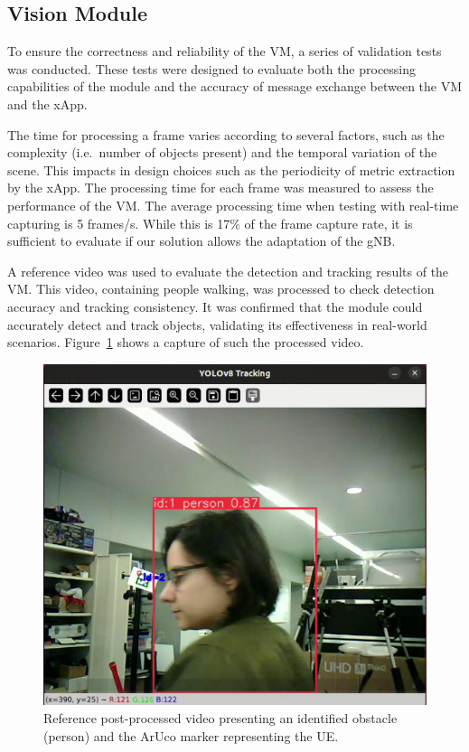 \subsection{Vision Module}\label{subsec:cv_module}
To ensure the correctness and reliability of the VM, a series of validation tests was conducted.
These tests were designed to evaluate both the processing capabilities of the module and the accuracy of message exchange between the VM and the xApp.

The time for processing a frame varies according to several factors, such as the complexity (i.e.\ number of objects present) and the temporal variation of the scene.
This impacts in design choices such as the periodicity of metric extraction by the xApp.
The processing time for each frame was measured to assess the performance of the VM\@.
The average processing time when testing with real-time capturing is 5 frames/s\@.
While this is 17\% of the frame capture rate, it is sufficient to evaluate if our solution allows the adaptation of the gNB\@.

A reference video was used to evaluate the detection and tracking results of the VM\@.
This video, containing people walking, was processed to check detection accuracy and tracking consistency.
It was confirmed that the module could accurately detect and track objects, validating its effectiveness in real-world scenarios.
Figure~\ref{fig:reference_video} shows a capture of such the processed video.


\begin{figure}[H]
    \centering
    \includegraphics[width=0.7\linewidth]{figures/reference_frame}
    \caption{Reference post-processed video presenting an identified obstacle (person) and the ArUco marker representing the UE.}
    \label{fig:reference_video}
\end{figure}

